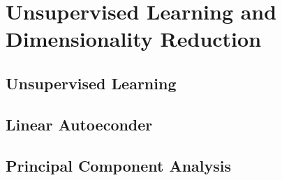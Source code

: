 \chapter{Unsupervised Learning and Dimensionality Reduction}
\section{Unsupervised Learning}
\section{Linear Autoeconder}
\section{Principal Component Analysis}
